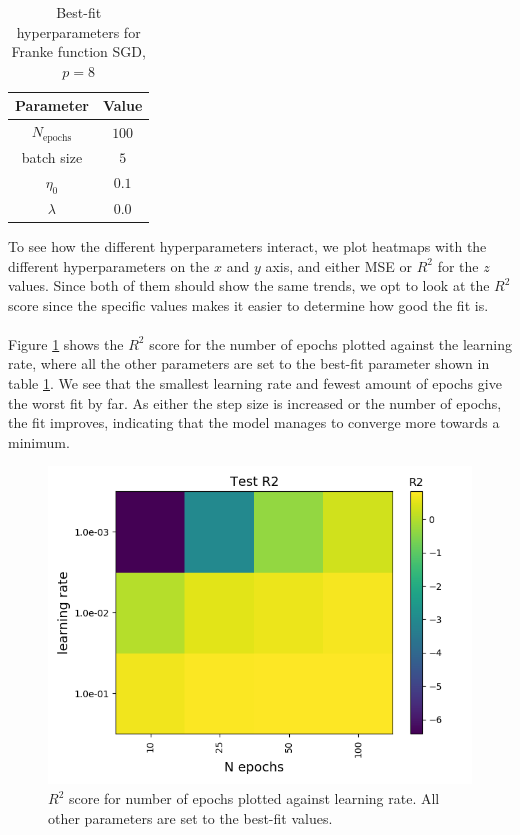\documentclass[a4paper]{article}
\newcommand{\Nepochs}{N_{\text{epochs}}}
\begin{document}
\begin{table}[H]
  \centering
  \caption{Best-fit hyperparameters for Franke function SGD, $p=8$}
  \label{tab:sgd_best_fit8}
  \begin{tabular}{c|c}
    \hline\hline
    Parameter & Value\\\hline
    $\Nepochs$ &  $100$\\
    batch size &  $5$\\
    $\eta_0$ & $0.1$ \\
    $\lambda$ & $0.0$
    \end{tabular}
\end{table}
To see how the different hyperparameters interact, we plot heatmaps with the different hyperparameters on the $x$ and $y$ axis, and either MSE or $R^2$ for the $z$ values. Since both of them should show the same trends, we opt to look at the $R^2$ score since the specific values makes it easier to determine how good the fit is.
\\\\
Figure \ref{fig:sgd_1} shows the $R^2$ score for the number of epochs plotted against the learning rate, where all the other parameters are set to the best-fit parameter shown in table \ref{tab:sgd_best_fit8}. We see that the smallest learning rate and fewest amount of epochs give the worst fit by far. As either the step size is increased or the number of epochs, the fit improves, indicating that the model manages to converge more towards a minimum.
\begin{figure}[H]
	\centering
	\includegraphics[scale=0.5]{../figures/task_a/test_p8/heatmap_test_p8_lr_constant_Nhyp4434_R2_n_epochs_eta0.png}
	\caption{$R^2$ score for number of epochs plotted against learning rate. All other parameters are set to the best-fit values.}
	\label{fig:sgd_1}
\end{figure}
\end{document}
